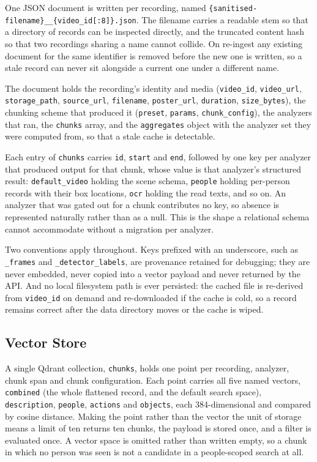 One JSON document is written per recording, named
\texttt{\{sanitised-filename\}\_\_\{video\_id[:8]\}.json}. The filename carries a
readable stem so that a directory of records can be inspected directly, and the truncated
content hash so that two recordings sharing a name cannot collide. On re-ingest any
existing document for the same identifier is removed before the new one is written, so a
stale record can never sit alongside a current one under a different name.

The document holds the recording's identity and media (\texttt{video\_id},
\texttt{video\_url}, \texttt{storage\_path}, \texttt{source\_url}, \texttt{filename},
\texttt{poster\_url}, \texttt{duration}, \texttt{size\_bytes}), the chunking scheme that
produced it (\texttt{preset}, \texttt{params}, \texttt{chunk\_config}), the analyzers
that ran, the \texttt{chunks} array, and the \texttt{aggregates} object with the analyzer
set they were computed from, so that a stale cache is detectable.

Each entry of \texttt{chunks} carries \texttt{id}, \texttt{start} and \texttt{end},
followed by one key per analyzer that produced output for that chunk, whose value is that
analyzer's structured result: \texttt{default\_video} holding the scene schema,
\texttt{people} holding per-person records with their box locations, \texttt{ocr} holding
the read texts, and so on. An analyzer that was gated out for a chunk contributes no key,
so absence is represented naturally rather than as a null. This is the shape a relational
schema cannot accommodate without a migration per analyzer.

Two conventions apply throughout. Keys prefixed with an underscore, such as
\texttt{\_frames} and \texttt{\_detector\_labels}, are provenance retained for debugging;
they are never embedded, never copied into a vector payload and never returned by the
API. And no local filesystem path is ever persisted: the cached file is re-derived from
\texttt{video\_id} on demand and re-downloaded if the cache is cold, so a record remains
correct after the data directory moves or the cache is wiped.

\subsection{Vector Store}

A single Qdrant collection, \texttt{chunks}, holds one point per recording, analyzer,
chunk span and chunk configuration. Each point carries all five named vectors,
\texttt{combined} (the whole flattened record, and the default search space),
\texttt{description}, \texttt{people}, \texttt{actions} and \texttt{objects}, each
384-dimensional and compared by cosine distance. Making the point rather than the vector
the unit of storage means a limit of ten returns ten chunks, the payload is stored once,
and a filter is evaluated once. A vector space is omitted rather than written empty, so a
chunk in which no person was seen is not a candidate in a people-scoped search at all.

